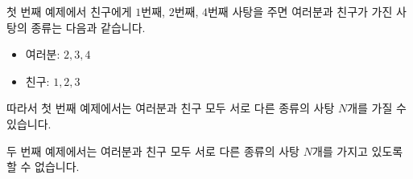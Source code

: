 첫 번째 예제에서 친구에게 $1$번째, $2$번째, $4$번째 사탕을 주면 여러분과 친구가 가진 사탕의 종류는 다음과 같습니다.

\begin{itemize}
\item 여러분: $2,3,4$
\item 친구: $1,2,3$
\end{itemize}

따라서 첫 번째 예제에서는 여러분과 친구 모두 서로 다른 종류의 사탕 $N$개를 가질 수 있습니다.

두 번째 예제에서는 여러분과 친구 모두 서로 다른 종류의 사탕 $N$개를 가지고 있도록 할 수 없습니다.